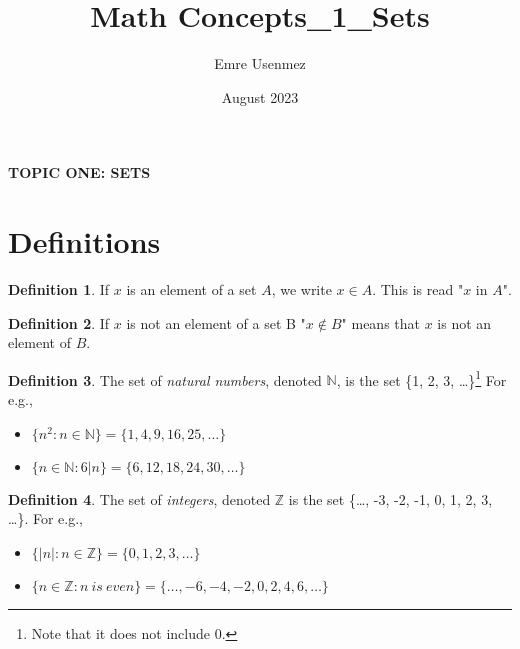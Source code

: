 \documentclass{amsart} %
\title{Math Concepts_1_Sets}
\author{Emre Usenmez}
\date{August 2023}
\theoremstyle{definition} %
\newtheorem*{dfn}{Definition} %
\theoremstyle{definition}
\theoremstyle{remark} %
\begin{document}


\begin{center}
      \textbf{TOPIC ONE: SETS}
\end{center}



\section{\textbf{Definitions}}


\begin{dfn}
\boxed{\in} \quad If $x$ is an element of a set $A$, we write $x \in A$. This is read "$x$ in $A$". %
\end{dfn}

\begin{dfn}
\boxed{\not\in} \quad If $x$ is not an element of a set B "$x \not\in B$" means that $x$ is not an element of $B$.
\end{dfn}

\begin{dfn}
 \quad The set of \emph{natural numbers}, denoted $\mathbb{N}$, is the set \{1, 2, 3, \dots\}\footnote{Note that it does not include 0.} For e.g.,
    \begin{itemize}
          \item $\{n^2:n \in \mathbb{N} \} = \{1, 4, 9, 16, 25, \dots\}$
          \item $\{n \in \mathbb{N} : 6|n\} = \{6, 12, 18, 24, 30, \dots\}$
    \end{itemize}
\end{dfn}

\begin{dfn}
 \quad The set of \emph{integers}, denoted $\mathbb{Z}$ is the set \{\dots, -3, -2, -1, 0, 1, 2, 3, \dots \}. For e.g.,
    \begin{itemize}
          \item $\{|n|:n \in \mathbb{Z} \} = \{0, 1, 2, 3, \dots\}$
          \item $\{n \in \mathbb{Z}: n\ is\ even\} = \{\dots, -6, -4, -2, 0, 2, 4, 6, \dots \}$ %
    \end{itemize}
\end{dfn}
\end{document}
